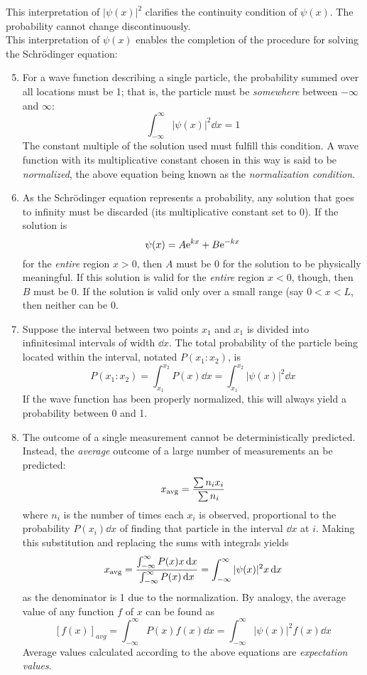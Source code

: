 \documentclass{subfiles}
\begin{document}
			This interpretation of \(|\psi(x)|^2\) clarifies the continuity condition of \(\psi(x)\). The probability cannot change discontinuously. \\
			This interpretation of \(\psi(x)\) enables the completion of the procedure for solving the Schr\"odinger equation:
			\begin{enumerate}
				\setcounter{enumi}{4}
				\item
					For a wave function describing a single particle, the probability summed over all locations must be 1; that is, the particle must be \textit{somewhere} between \(-\infty\) and \(\infty\):
					\[\int_{-\infty}^\infty |\psi(x)|^2 \dd{x} = 1\]
					The constant multiple of the solution used must fulfill this condition. A wave function with its multiplicative constant chosen in this way is said to be \textit{normalized}, the above equation being known as the \textit{normalization condition}.
				\item
					As the Schr\"odinger equation represents a probability, any solution that goes to infinity must be discarded (its multiplicative constant set to 0). If the solution is
						\[\psi(x) = A\text{e}^{kx} + B\text{e}^{-kx}\]
						for the \textit{entire} region \(x > 0\), then \(A\) must be 0 for the solution to be physically meaningful. If this solution is valid for the \textit{entire} region \(x < 0\), though, then \(B\) must be 0. If the solution is valid only over a small range (say \(0 < x < L\), then neither can be 0.
				\item
					Suppose the interval between two points \(x_1\) and \(x_1\) is divided into infinitesimal intervals of width \(\dd{x}\). The total probability of the particle being located within the interval, notated \(P(x_1:x_2)\), is 
						\[
							P(x_1:x_2) = \int_{x_1}^{x_2} P(x) \dd{x}
								= \int_{x_1}^{x_2} |\psi(x)|^2 \dd{x}
						\]
						If the wave function has been properly normalized, this will always yield a probability between 0 and 1.
				\item
					The outcome of a single measurement cannot be deterministically predicted. Instead, the \textit{average} outcome of a large number of measurements an be predicted:
						\[x_{\text{avg}} = \frac{\sum n_ix_i}{\sum n_i}\]
						where \(n_i\) is the number of times each \(x_i\) is observed, proportional to the probability \(P(x_i)\dd{x}\) of finding that particle in the interval \(\dd{x}\) at \(i\). Making this substitution and replacing the sums with integrals yields
						\[
							x_{\text{avg}} = \frac{\int_{-\infty}^\infty P(x)x \dd{x}}{\int_{-\infty}^\infty P(x) \dd{x}}
								= \int_{-\infty}^\infty |\psi(x)|^2x \dd{x}
						\]
						as the denominator is 1 due to the normalization. By analogy, the average value of any function \(f\) of \(x\) can be found as
						\[
							[f(x)]_{avg} = \int_{-\infty}^\infty P(x)f(x) \dd{x}
								= \int_{-\infty}^\infty |\psi(x)|^2f(x) \dd{x}
						\]
						Average values calculated according to the above equations are \textit{expectation values}.
			\end{enumerate}
\end{document}
